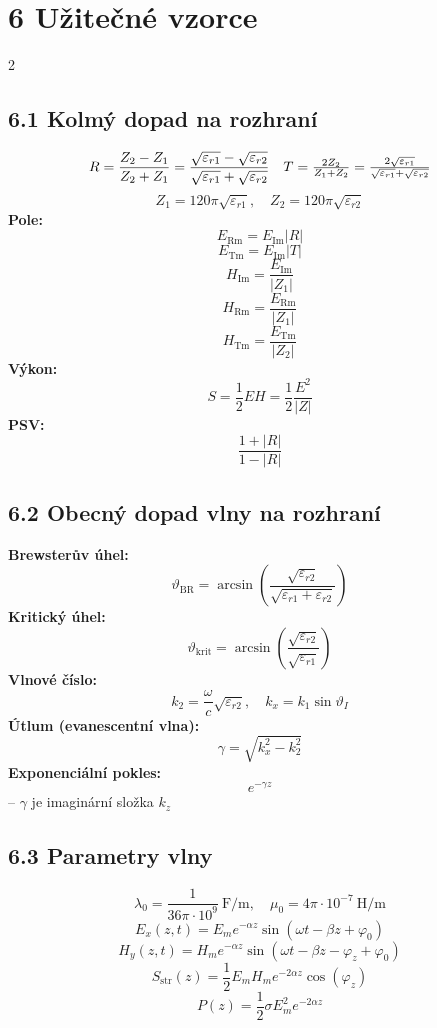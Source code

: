 \documentclass[10pt]{article}
\begin{document}
\section*{6 Užitečné vzorce}

\raggedbottom
\begin{multicols}{2}
\subsection*{6.1 Kolmý dopad na rozhraní}
\[
R = \frac{Z_2 - Z_1}{Z_2 + Z_1} = \frac{\sqrt{\varepsilon_{r1}} - \sqrt{\varepsilon_{r2}}}{\sqrt{\varepsilon_{r1}} + \sqrt{\varepsilon_{r2}}}$$$$ \quad T = \frac{2Z_2}{Z_1 + Z_2} = \frac{2\sqrt{\varepsilon_{r1}}}{\sqrt{\varepsilon_{r1}} + \sqrt{\varepsilon_{r2}}}
\]
\[
Z_1 = 120\pi \sqrt{\varepsilon_{r1}}, \quad Z_2 = 120\pi \sqrt{\varepsilon_{r2}}
\]
\textbf{Pole:} $$E_{\mathrm{Rm}} = E_{\mathrm{Im}}|R|$$ $$E_{\mathrm{Tm}} = E_{\mathrm{Im}}|T|$$ $$H_{\mathrm{Im}} = \frac{E_{\mathrm{Im}}}{|Z_1|}$$ $$H_{\mathrm{Rm}} = \frac{E_{\mathrm{Rm}}}{|Z_1|}$$ $$H_{\mathrm{Tm}} = \frac{E_{\mathrm{Tm}}}{|Z_2|}$$ 
\textbf{Výkon:} $$S = \frac{1}{2} E H = \frac{1}{2} \frac{E^2}{|Z|}$$
\textbf{PSV:} $$\frac{1 + |R|}{1 - |R|}$$

\subsection*{6.2 Obecný dopad vlny na rozhraní}
\textbf{Brewsterův úhel:} $$\vartheta_\mathrm{BR} = \arcsin\left( \frac{\sqrt{\varepsilon_{r2}}}{\sqrt{\varepsilon_{r1} + \varepsilon_{r2}}} \right)$$  
\textbf{Kritický úhel:} $$\vartheta_\mathrm{krit} = \arcsin\left( \frac{\sqrt{\varepsilon_{r2}}}{\sqrt{\varepsilon_{r1}}} \right)$$  
\textbf{Vlnové číslo:} $$k_2 = \frac{\omega}{c} \sqrt{\varepsilon_{r2}}, \quad k_x = k_1 \sin \vartheta_I$$  
\textbf{Útlum (evanescentní vlna):} $$\gamma = \sqrt{k_x^2 - k_2^2}$$  
\textbf{Exponenciální pokles:} $$e^{-\gamma z}$$ – $\gamma$ je imaginární složka $k_z$

\subsection*{6.3 Parametry vlny}
$$\lambda_0 = \frac{1}{36\pi \cdot 10^9} \ \mathrm{F/m}, \quad \mu_0 = 4\pi \cdot 10^{-7} \ \mathrm{H/m}$$
$$E_x(z,t) = E_m e^{-\alpha z} \sin(\omega t - \beta z + \varphi_0)$$  
$$H_y(z,t) = H_m e^{-\alpha z} \sin(\omega t - \beta z - \varphi_z + \varphi_0)$$  
$$S_{\mathrm{str}}(z) = \frac{1}{2} E_m H_m e^{-2\alpha z} \cos(\varphi_z)$$  
$$P(z) = \frac{1}{2} \sigma E_m^2 e^{-2\alpha z}$$


\end{multicols}
\end{document}
